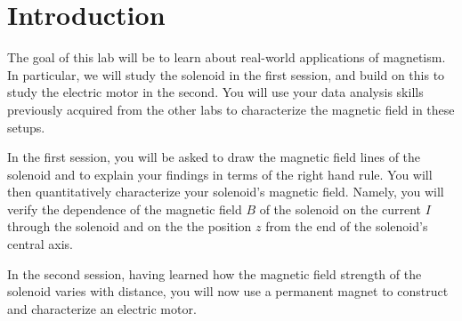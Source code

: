 \documentclass[12pt]{report}
\begin{document}
\section{Introduction}
The goal of this lab will be to learn about real-world applications of magnetism. In particular, we will study the solenoid in the first session, and build on this to study the electric motor in the second. You will use your data analysis skills previously acquired from the other labs to characterize the magnetic field in these setups.

In the first session, you will be asked to draw the magnetic field lines of the solenoid and to explain your findings in terms of the right hand rule. You will then quantitatively characterize your solenoid's magnetic field. Namely, you will verify the dependence of the magnetic field $B$ of the solenoid on the current $I$ through the solenoid and on the the position $z$ from the end of the solenoid's central axis.

In the second session, having learned how the magnetic field strength of the solenoid varies with distance, you will now use a permanent magnet to construct and characterize an electric motor.
\end{document}
